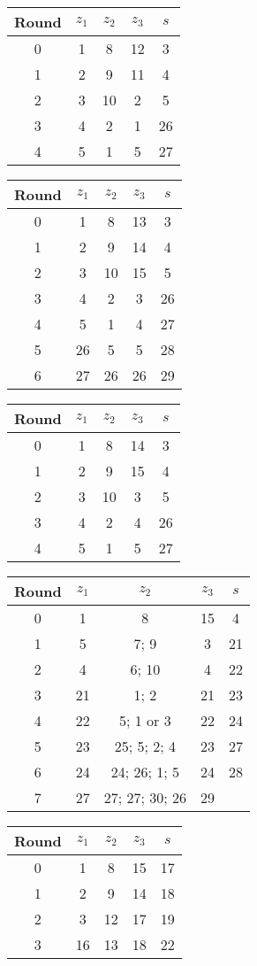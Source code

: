 \begin{multicols}{2}
\begin{tabular}{c | c | c | c | c }
Round & $z_1$ & $z_2$ & $z_3$ & $s$ \\
\hline
0 & 1 & 8 & 12 & 3 \\
1 & 2 & 9 & 11 & 4 \\
2 & 3 & 10 & 2 & 5 \\
3 & 4 & 2 & 1 & 26 \\
4 & 5 & 1 & 5 & 27
\end{tabular}


\begin{tabular}{c | c | c | c | c }
Round & $z_1$ & $z_2$ & $z_3$ & $s$ \\
\hline
0 & 1 & 8 & 13 & 3 \\
1 & 2 & 9 & 14 & 4 \\
2 & 3 & 10 & 15 & 5 \\
3 & 4 & 2 & 3 & 26 \\
4 & 5 & 1 & 4 & 27 \\
5 & 26 & 5 & 5 & 28 \\
6 & 27 & 26 & 26 & 29
\end{tabular}


\begin{tabular}{c | c | c | c | c }
Round & $z_1$ & $z_2$ & $z_3$ & $s$ \\
\hline
0 & 1 & 8 & 14 & 3 \\
1 & 2 & 9 & 15 & 4 \\
2 & 3 & 10 & 3 & 5 \\
3 & 4 & 2 & 4 & 26 \\
4 & 5 & 1 & 5 & 27
\end{tabular}


\begin{tabular}{c | c | c | c | c }
Round & $z_1$ & $z_2$ & $z_3$ & $s$ \\
\hline
0 & 1 & 8 & 15 & 4 \\
1 & 5 & 7; 9 & 3 & 21 \\
2 & 4 & 6; 10 & 4 & 22 \\
3 & 21 & 1; 2 & 21 & 23 \\
4 & 22 & 5; 1 or 3 & 22 & 24 \\
5 & 23 & 25; 5; 2; 4 & 23 & 27 \\
6 & 24 & 24; 26; 1; 5 & 24 & 28 \\
7 & 27 & 27; 27; 30; 26 & 29
\end{tabular}


\begin{tabular}{c | c | c | c | c }
Round & $z_1$ & $z_2$ & $z_3$ & $s$ \\
\hline
0 & 1 & 8 & 15 & 17 \\
1 & 2 & 9 & 14 & 18 \\
2 & 3 & 12 & 17 & 19 \\
3 & 16 & 13 & 18 & 22
\end{tabular}


\end{multicols}
